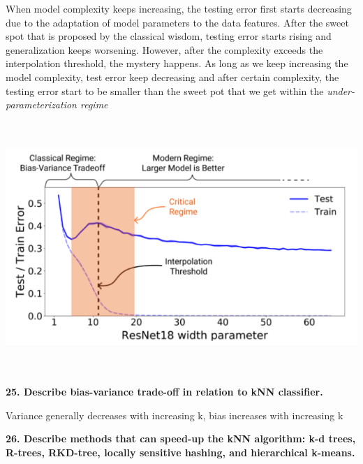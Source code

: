 When model complexity keeps increasing, the testing error first starts
decreasing due to the adaptation of model parameters to the data
features. After the sweet spot that is proposed by the classical wisdom,
testing error starts rising and generalization keeps worsening. However,
after the complexity exceeds the interpolation threshold, the mystery
happens. As long as we keep increasing the model complexity, test error
keep decreasing and after certain complexity, the testing error start to
be smaller than the sweet pot that we get within the
\emph{under-parameterization regime}

\includegraphics[width=6.70313in,height=3.73592in]{media/image24.png}

\textbf{25. Describe bias-variance trade-off in relation to kNN
classifier.}

Variance generally decreases with increasing k, bias increases with
increasing k

\textbf{26. Describe methods that can speed-up the kNN algorithm: k-d
trees, R-trees, RKD-tree, locally sensitive hashing, and hierarchical
k-means.}

